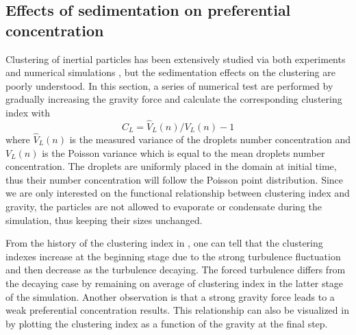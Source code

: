 \documentclass[draft,jgrga]{AGUTeX}
\begin{document}
\begin{article}
\section{Effects of sedimentation on preferential concentration }\label{sedimentation}
Clustering of inertial particles has been extensively studied via both 
experiments and numerical simulations \cite{Sundaram97, Reade2000}, but the sedimentation effects on the clustering are poorly understood. In this section, a series of numerical test are performed by gradually increasing the gravity force and calculate the corresponding clustering index \cite{Vaillancourt02} with
\begin{equation}
C_L = \hat{V}_L(n)/V_L(n)-1
\label{eq:cluster_index}
\end{equation}
where $\hat{V}_L(n)$ is the measured variance of the droplets number concentration and $V_L(n)$ is the Poisson variance which is equal to the mean droplets number concentration.
The droplets are uniformly placed in the domain at initial time, thus their number concentration will follow the Poisson point distribution. Since we are only interested on the functional relationship between clustering index and gravity, the particles are not allowed to evaporate or condensate during the simulation, thus keeping their sizes unchanged.

From the history of the clustering index in , one can tell that the clustering indexes increase at the beginning stage due to the strong turbulence fluctuation and then decrease as the turbulence decaying. The forced turbulence differs from the decaying case by remaining on average of clustering index in the latter stage of the simulation. Another observation is that a strong gravity force leads to a weak preferential concentration results. This relationship can also be visualized in  by plotting the clustering index as a function of the gravity at the final step. 


\end{article}
\end{document}
